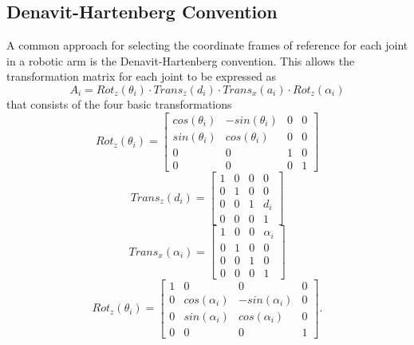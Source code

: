 \subsection*{Denavit-Hartenberg Convention}
A common approach for selecting the coordinate frames of reference for each joint in a robotic arm is the Denavit-Hartenberg convention. This allows the transformation matrix for each joint to be expressed as
\begin{equation}
    A_i = Rot_{z}(\theta_i) \cdot Trans_{z}(d_i) \cdot Trans_{x}(a_i) \cdot Rot_{z}(\alpha_i)
    \label{eqn:DH-transformation}
\end{equation}
that consists of the four basic transformations
\begin{equation}
    Rot_z(\theta_i) = 
    \begin{bmatrix}
        cos(\theta_i) & -sin(\theta_i) & 0 & 0 \\
        sin(\theta_i) & cos(\theta_i) & 0 & 0 \\
        0 & 0 & 1 & 0 \\
        0 & 0 & 0 & 1
    \end{bmatrix}
\end{equation}
\begin{equation}
    Trans_z(d_i) = 
    \begin{bmatrix}
        1 & 0 & 0 & 0 \\
        0 & 1 & 0 & 0 \\
        0 & 0 & 1 & d_i \\
        0 & 0 & 0 & 1
    \end{bmatrix}
\end{equation}
\begin{equation}
    Trans_x(\alpha_i) = 
    \begin{bmatrix}
        1 & 0 & 0 & \alpha_i \\
        0 & 1 & 0 & 0 \\
        0 & 0 & 1 & 0 \\
        0 & 0 & 0 & 1
    \end{bmatrix}
\end{equation}
\begin{equation}
    Rot_z(\theta_i) = 
    \begin{bmatrix}
        1 & 0 & 0 & 0 \\
        0 & cos(\alpha_i) & -sin(\alpha_i) & 0 \\
        0 & sin(\alpha_i) & cos(\alpha_i) & 0 \\
        0 & 0 & 0 & 1
    \end{bmatrix}.
\end{equation}


